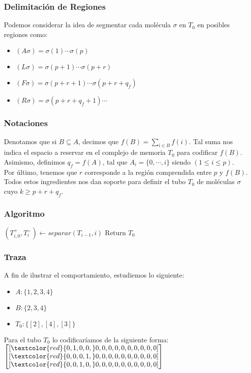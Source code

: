 \documentclass[12pt]{beamer}
\begin{document}
 \begin{frame}
     \frametitle{Delimitación de Regiones}
     Podemos considerar la idea de segmentar cada molécula $\sigma$ en $T_0$ en posibles regiones como:
    \begin{itemize}
        \item $(A\sigma)=\sigma (1)\cdots\sigma (p)$
        \item $(L\sigma)=\sigma (p+1)\cdots\sigma (p+r)$
        \item $(F\sigma)=\sigma(p+r+1)\cdots\sigma(p+r+q_f)$
        \item $(R\sigma)=\sigma(p+r+q_f+1)\cdots$
    \end{itemize}
 \end{frame}
 \begin{frame}
    \frametitle{Notaciones}
    Denotamos que si $B\subseteq A$, decimos que  $f(B)=\sum_{i\in B}f(i)$. Tal suma nos indica el espacio a reservar en el complejo de memoria $T_0$ para codificar $f(B)$. \\
    Asimismo, definimos $q_f=f(A)$, tal que $A_i=\{0,\cdots,i\}$ siendo $(1\leq i\leq p)$. \\
    Por último, tenemos que $r$ corresponde a la región comprendida entre $p$ y $f(B)$.\\
    Todos estos ingredientes nos dan soporte para definir el tubo $T_0$ de moléculas $\sigma$ cuyo $k\geq p+r+q_f$.
 \end{frame}
 \begin{frame}
     \frametitle{Algoritmo}
    \begin{algorithmic}[1]
            \State $(T^+_{i,0}, T^-_i) \leftarrow separar(T_{i-1}, i)$
            \EndFor
        \EndFor
        \State Return $T_0$
        \EndProcedure
    \end{algorithmic}
 \end{frame}
 \begin{frame}
     \frametitle{Traza}
     A fin de ilustrar el comportamiento, estudiemos lo siguiente:
     \begin{itemize}
        \item $A: \{1, 2, 3, 4\}$
        \item $B: \{2, 3, 4\}$
        \item $T_0: \{[2], [4], [3]\}$
     \end{itemize}
     Para el tubo $T_0$ lo codificaríamos de la siguiente forma:
     $
        \begin{bmatrix}
        [\textcolor{red}{0, 1, 0, 0,} 0, 0, 0, 0, 0, 0, 0, 0, 0, 0] \\
        [\textcolor{red}{0, 0, 0, 1,} 0, 0, 0, 0, 0, 0, 0, 0, 0, 0] \\
        [\textcolor{red}{0, 0, 1, 0,} 0, 0, 0, 0, 0, 0, 0, 0, 0, 0]
        \end{bmatrix}
    $
 \end{frame}
\end{document}
